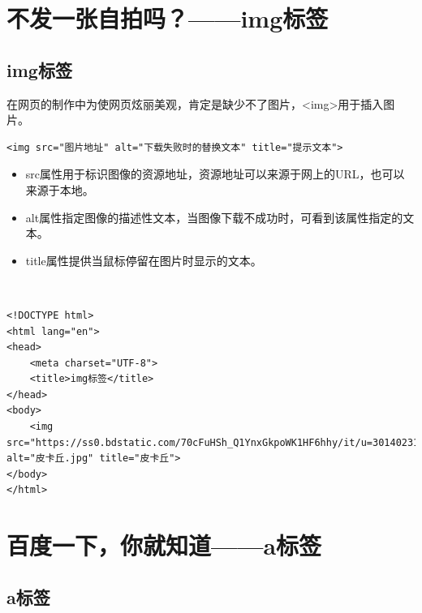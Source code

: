 \newpage

\section{不发一张自拍吗？——img标签}

\subsection{img标签}

在网页的制作中为使网页炫丽美观，肯定是缺少不了图片，<img>用于插入图片。\\

\begin{lstlisting}[style=htmlcssjs]
<img src="图片地址" alt="下载失败时的替换文本" title="提示文本">
\end{lstlisting}

\begin{itemize}
	\item src属性用于标识图像的资源地址，资源地址可以来源于网上的URL，也可以来源于本地。

	\item alt属性指定图像的描述性文本，当图像下载不成功时，可看到该属性指定的文本。

	\item title属性提供当鼠标停留在图片时显示的文本。
\end{itemize}

\vspace{0.5cm}

\\

\begin{lstlisting}[style=htmlcssjs, breaklines=true, breakatwhitespace=false]
<!DOCTYPE html>
<html lang="en">
<head>
    <meta charset="UTF-8">
    <title>img标签</title>
</head>
<body>
    <img src="https://ss0.bdstatic.com/70cFuHSh_Q1YnxGkpoWK1HF6hhy/it/u=3014023147,616635741&fm=26&gp=0.jpg" alt="皮卡丘.jpg" title="皮卡丘">
</body>
</html>
\end{lstlisting}

\newpage

\section{百度一下，你就知道——a标签}

\subsection{a标签}

